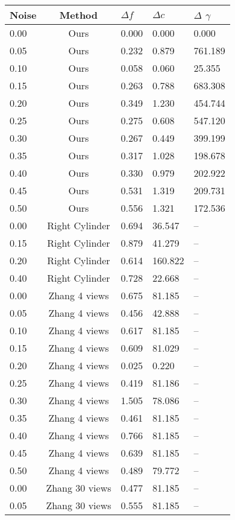 \begin{table}[H]
\centering
\begin{tabular}{l c l l l}
\toprule
Noise & Method & $\Delta f$ & $\Delta c$ & $\Delta$ $\gamma$ \\
\midrule
0.00 & Ours & 0.000 & 0.000 & 0.000 \\
0.05 & Ours & 0.232 & 0.879 & 761.189 \\
0.10 & Ours & 0.058 & 0.060 & 25.355 \\
0.15 & Ours & 0.263 & 0.788 & 683.308 \\
0.20 & Ours & 0.349 & 1.230 & 454.744 \\
0.25 & Ours & 0.275 & 0.608 & 547.120 \\
0.30 & Ours & 0.267 & 0.449 & 399.199 \\
0.35 & Ours & 0.317 & 1.028 & 198.678 \\
0.40 & Ours & 0.330 & 0.979 & 202.922 \\
0.45 & Ours & 0.531 & 1.319 & 209.731 \\
0.50 & Ours & 0.556 & 1.321 & 172.536 \\
\midrule
\midrule
0.00 & Right Cylinder & 0.694 & 36.547 & -- \\
0.15 & Right Cylinder & 0.879 & 41.279 & -- \\
0.20 & Right Cylinder & 0.614 & 160.822 & -- \\
0.40 & Right Cylinder & 0.728 & 22.668 & -- \\
\midrule
0.00 & Zhang 4 views & 0.675 & 81.185 & -- \\
0.05 & Zhang 4 views & 0.456 & 42.888 & -- \\
0.10 & Zhang 4 views & 0.617 & 81.185 & -- \\
0.15 & Zhang 4 views & 0.609 & 81.029 & -- \\
0.20 & Zhang 4 views & 0.025 & 0.220 & -- \\
0.25 & Zhang 4 views & 0.419 & 81.186 & -- \\
0.30 & Zhang 4 views & 1.505 & 78.086 & -- \\
0.35 & Zhang 4 views & 0.461 & 81.185 & -- \\
0.40 & Zhang 4 views & 0.766 & 81.185 & -- \\
0.45 & Zhang 4 views & 0.639 & 81.185 & -- \\
0.50 & Zhang 4 views & 0.489 & 79.772 & -- \\
\midrule
0.00 & Zhang 30 views & 0.477 & 81.185 & -- \\
0.05 & Zhang 30 views & 0.555 & 81.185 & -- \\

\end{tabular}
\end{table}
